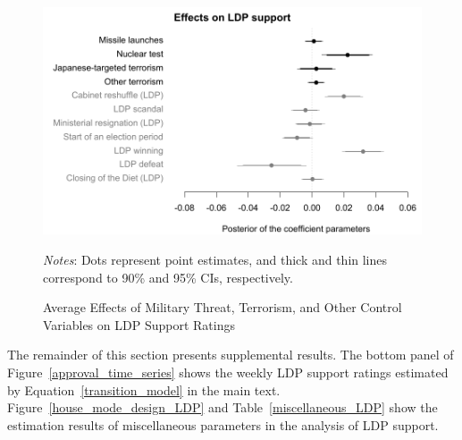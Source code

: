 \documentclass[12pt,letterpaper]{scrartcl}
\begin{document}
\begin{figure}[!ht]
\begin{minipage}{\hsize}
\centering
\singlespacing
\includegraphics[scale=1]{Figure_JCR/average_effect_on_LDP_support.pdf}
\caption{Average Effects of Military Threat, Terrorism, and Other Control Variables on LDP Support Ratings}
\label{average_effect_on_LDP_support}
\end{minipage}
\begin{minipage}{\hsize}
\singlespacing
\small
\emph{Notes}: Dots represent point estimates, and thick and thin lines correspond to 90\% and 95\% CIs, respectively.
\end{minipage}
\end{figure}

The remainder of this section presents supplemental results. The bottom panel of Figure~\ref{approval_time_series} shows the weekly LDP support ratings estimated by Equation~\eqref{transition_model} in the main text. Figure~\ref{house_mode_design_LDP} and Table~\ref{miscellaneous_LDP} show the estimation results of miscellaneous parameters in the analysis of LDP support.
\end{document}
